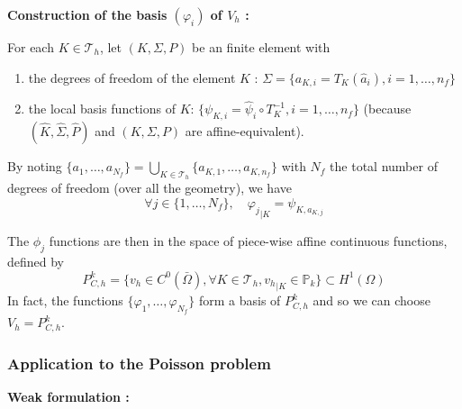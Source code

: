 \textbf{Construction of the basis $(\varphi_i)$ of $V_h$ :}

For each $K\in\mathcal{T}_h$, let $(K,\Sigma,P)$ be an finite element with 
\begin{enumerate}[label=\textbullet]
	\item the degrees of freedom of the element $K$ : $\Sigma=\{a_{K,i}=T_K(\hat{a}_i), i=1,\dots,n_f\}$
	\item the local basis functions of $K$: $\{\psi_{K,i}=\hat{\psi}_i\circ T_K^{-1}, i=1,\dots,n_f\}$ (because $(\hat{K},\hat{\Sigma},\hat{P})$ and $(K,\Sigma,P)$ are affine-equivalent).
\end{enumerate}

By noting $\{a_1,\dots,a_{N_f}\}=\bigcup_{K\in\mathcal{T}_h}\{a_{K,1},\dots,a_{K,n_f}\}$ with $N_f$ the total number of degrees of freedom (over all the geometry), we have
\begin{equation*}
	\forall j\in\{1,\dots,N_f\}, \quad {\varphi_j}_{|K}=\psi_{K,a_{K,j}}
\end{equation*}

The $\phi_j$ functions are then in the space of piece-wise affine continuous functions, defined by
\begin{equation*}
	P_{C,h}^k=\{v_h\in C^0(\bar{\Omega}), \forall K\in\mathcal{T}_h, {v_h}_{|K}\in\mathbb{P}_k\}\subset H^1(\Omega)
\end{equation*}
In fact, the functions $\{\varphi_1,\dots,\varphi_{N_f}\}$ form a basis of $P_{C,h}^k$ and so we can choose $V_h=P_{C,h}^k$.

\subsubsection{Application to the Poisson problem}

\textbf{Weak formulation :}

